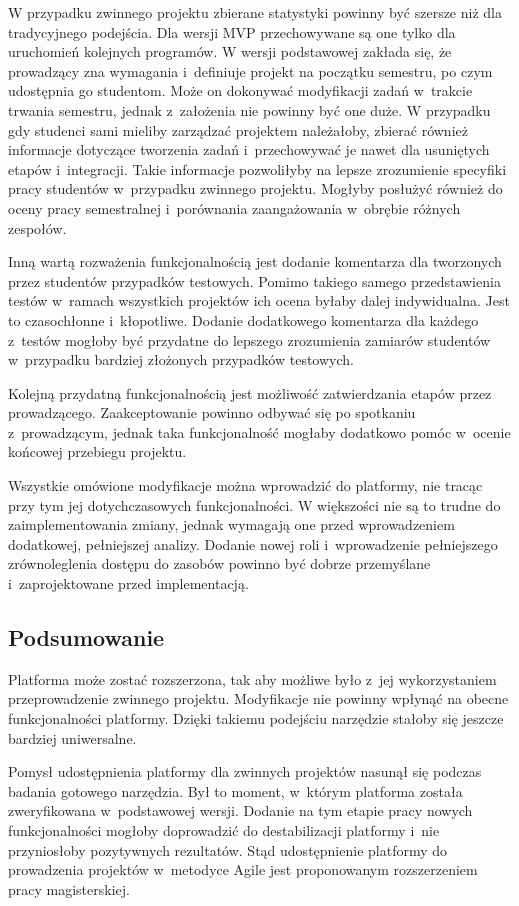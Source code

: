 W przypadku zwinnego projektu zbierane statystyki powinny być szersze niż dla tradycyjnego podejścia.
Dla wersji MVP przechowywane są one tylko dla uruchomień kolejnych programów.
W wersji podstawowej zakłada się, że prowadzący zna wymagania i~definiuje projekt na początku semestru, po czym udostępnia go studentom.
Może on dokonywać modyfikacji zadań w~trakcie trwania semestru, jednak z~założenia nie powinny być one duże.
W przypadku gdy studenci sami mieliby zarządzać projektem należałoby, zbierać również informacje dotyczące tworzenia zadań i~przechowywać je nawet dla usuniętych etapów i~integracji.
Takie informacje pozwoliłyby na lepsze zrozumienie specyfiki pracy studentów w~przypadku zwinnego projektu.
Mogłyby posłużyć również do oceny pracy semestralnej i~porównania zaangażowania w~obrębie różnych zespołów.

Inną wartą rozważenia funkcjonalnością jest dodanie komentarza dla tworzonych przez studentów przypadków testowych.
Pomimo takiego samego przedstawienia testów w~ramach wszystkich projektów ich ocena byłaby dalej indywidualna.
Jest to czasochłonne i~kłopotliwe.
Dodanie dodatkowego komentarza dla każdego z~testów mogłoby być przydatne do lepszego zrozumienia zamiarów studentów w~przypadku bardziej złożonych przypadków testowych.

Kolejną przydatną funkcjonalnością jest możliwość zatwierdzania etapów przez prowadzącego.
Zaakceptowanie powinno odbywać się po spotkaniu z~prowadzącym, jednak taka funkcjonalność mogłaby dodatkowo pomóc w~ocenie końcowej przebiegu projektu.

Wszystkie omówione modyfikacje można wprowadzić do platformy, nie tracąc przy tym jej dotychczasowych funkcjonalności.
W większości nie są to trudne do zaimplementowania zmiany, jednak wymagają one przed wprowadzeniem dodatkowej, pełniejszej analizy.
Dodanie nowej roli i~wprowadzenie pełniejszego zrównoleglenia dostępu do zasobów powinno być dobrze przemyślane i~zaprojektowane przed implementacją.

\subsection{Podsumowanie}

Platforma może zostać rozszerzona, tak aby możliwe było z~jej wykorzystaniem przeprowadzenie zwinnego projektu.
Modyfikacje nie powinny wpłynąć na obecne funkcjonalności platformy.
Dzięki takiemu podejściu narzędzie stałoby się jeszcze bardziej uniwersalne.

Pomysł udostępnienia platformy dla zwinnych projektów nasunął się podczas badania gotowego narzędzia.
Był to moment, w~którym platforma została zweryfikowana w~podstawowej wersji.
Dodanie na tym etapie pracy nowych funkcjonalności mogłoby doprowadzić do destabilizacji platformy i~nie przyniosłoby pozytywnych rezultatów.
Stąd udostępnienie platformy do prowadzenia projektów w~metodyce Agile jest proponowanym rozszerzeniem pracy magisterskiej.


